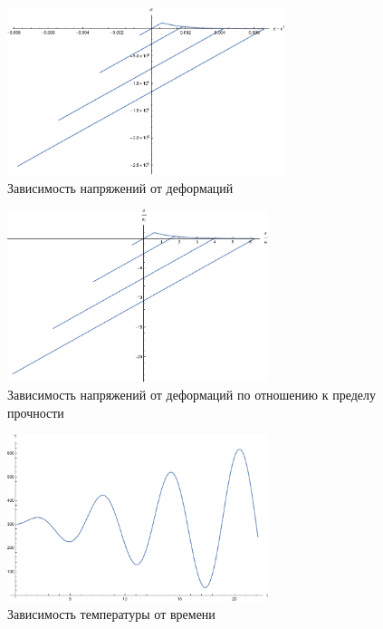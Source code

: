 \documentclass[12pt,a4paper]{article}
\begin{document}
\begin{enumerate}
    \begin{figure}[h]
      \centering
      \includegraphics[width=0.725\textwidth]{T1/h_1_tau_0.05/sigma(epsilon).pdf}
      \caption{Зависимость напряжений от деформаций}
    \end{figure}

    \pagebreak

    \begin{figure}[h]
      \centering
      \includegraphics[width=0.68\textwidth]{T1/h_1_tau_0.05/norm_sigma(epsilon).pdf}
      \caption{Зависимость напряжений от деформаций по отношению к пределу прочности}
    \end{figure}

    \begin{figure}[h]
      \centering
      \includegraphics[width=0.68\textwidth]{T1/h_1_tau_0.05/T(t).pdf}
      \caption{Зависимость температуры от времени}
    \end{figure}
    

\end{enumerate}
\end{document}

